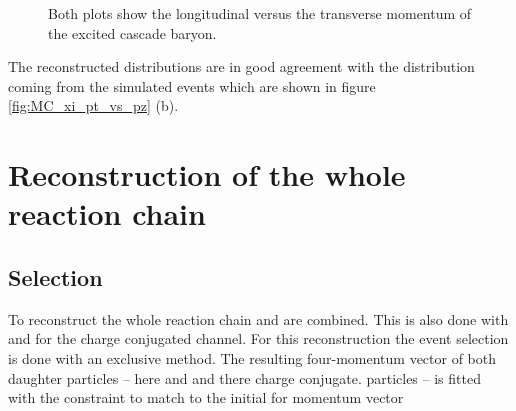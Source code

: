 	\begin{figure}
		\centering
		\caption{\propose Both plots show the longitudinal versus the transverse momentum of the excited cascade baryon.}
		\label{fig:xi1820_pt_vs_pz}
	\end{figure}
	
	The reconstructed distributions are in good agreement with the distribution coming from the simulated events which are 
	shown in figure \ref{fig:MC_xi_pt_vs_pz} (b).
	
\section{Reconstruction of the whole reaction chain}

	\subsection*{Selection}
	
	To reconstruct the whole reaction chain \excitedcascade and \anticascade are combined.
	This is also done with \excitedanticascade and \cascade for the charge conjugated channel.
	For this reconstruction the event selection is done with an exclusive method.
	The resulting four-momentum vector of both daughter particles --  here \excitedcascade 
	and \anticascade and there charge conjugate. particles -- is fitted with the constraint to match to the initial for momentum vector  

